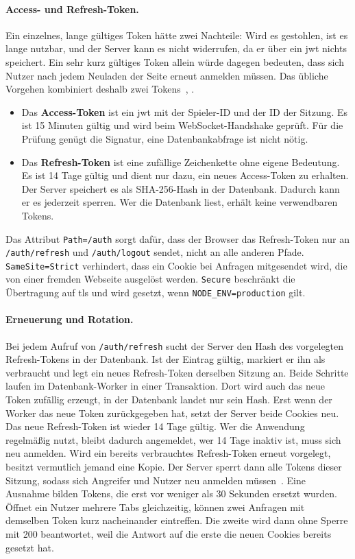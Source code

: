 \paragraph{Access- und Refresh-Token.} Ein einzelnes, lange gültiges Token hätte zwei Nachteile: Wird es gestohlen, ist es lange nutzbar, und der Server kann es nicht widerrufen, da er über ein \gls{jwt} nichts speichert. Ein sehr kurz gültiges Token allein würde dagegen bedeuten, dass sich Nutzer nach jedem Neuladen der Seite erneut anmelden müssen. Das übliche Vorgehen kombiniert deshalb zwei Tokens~\cite[Abschn.~1.5]{RFC6749}, \cite[Abschn.~4.14]{RFC9700}.

\begin{itemize}
  \item Das \textbf{Access-Token} ist ein \gls{jwt} mit der Spieler-ID und der ID der Sitzung. Es ist 15 Minuten gültig und wird beim WebSocket-Handshake geprüft. Für die Prüfung genügt die Signatur, eine Datenbankabfrage ist nicht nötig.
  \item Das \textbf{Refresh-Token} ist eine zufällige Zeichenkette ohne eigene Bedeutung. Es ist 14 Tage gültig und dient nur dazu, ein neues Access-Token zu erhalten. Der Server speichert es als SHA-256-Hash in der Datenbank. Dadurch kann er es jederzeit sperren. Wer die Datenbank liest, erhält keine verwendbaren Tokens.
\end{itemize}

Das Attribut \texttt{Path=/auth} sorgt dafür, dass der Browser das Refresh-Token nur an \texttt{/auth/refresh} und \texttt{/auth/logout} sendet, nicht an alle anderen Pfade. \texttt{SameSite=Strict} verhindert, dass ein Cookie bei Anfragen mitgesendet wird, die von einer fremden Webseite ausgelöst werden. \texttt{Secure} beschränkt die Übertragung auf \gls{tls} und wird gesetzt, wenn \texttt{NODE\_ENV=production} gilt.

\paragraph{Erneuerung und Rotation.} Bei jedem Aufruf von \texttt{/auth/refresh} sucht der Server den Hash des vorgelegten Refresh-Tokens in der Datenbank. Ist der Eintrag gültig, markiert er ihn als verbraucht und legt ein neues Refresh-Token derselben Sitzung an. Beide Schritte laufen im Datenbank-Worker in einer Transaktion. Dort wird auch das neue Token zufällig erzeugt, in der Datenbank landet nur sein Hash. Erst wenn der Worker das neue Token zurückgegeben hat, setzt der Server beide Cookies neu. Das neue Refresh-Token ist wieder 14 Tage gültig. Wer die Anwendung regelmäßig nutzt, bleibt dadurch angemeldet, wer 14 Tage inaktiv ist, muss sich neu anmelden. Wird ein bereits verbrauchtes Refresh-Token erneut vorgelegt, besitzt vermutlich jemand eine Kopie. Der Server sperrt dann alle Tokens dieser Sitzung, sodass sich Angreifer und Nutzer neu anmelden müssen~\cite[Abschn.~4.14.2]{RFC9700}. Eine Ausnahme bilden Tokens, die erst vor weniger als 30 Sekunden ersetzt wurden. Öffnet ein Nutzer mehrere Tabs gleichzeitig, können zwei Anfragen mit demselben Token kurz nacheinander eintreffen. Die zweite wird dann ohne Sperre mit 200 beantwortet, weil die Antwort auf die erste die neuen Cookies bereits gesetzt hat.

